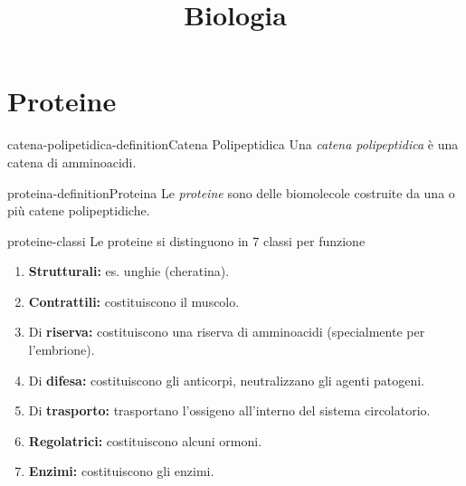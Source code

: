 \documentclass[preview]{standalone}
\begin{document}
\title{Biologia}
\genpage

\section{Proteine}




\begin{snippetdefinition}{catena-polipetidica-definition}{Catena Polipeptidica}
    Una \textit{catena polipeptidica} è una catena di amminoacidi.
\end{snippetdefinition}

\begin{snippetdefinition}{proteina-definition}{Proteina}
    Le \textit{proteine} sono delle biomolecole costruite
    da una o più catene polipeptidiche.
\end{snippetdefinition}

\begin{snippet}{proteine-classi}
    Le proteine si distinguono in 7 classi per funzione
    \begin{enumerate}
        \item \textbf{Strutturali:} es. unghie (cheratina).

        \item \textbf{Contrattili:} costituiscono il muscolo.

        \item Di \textbf{riserva:} costituiscono una riserva di amminoacidi (specialmente per l'embrione).

        \item Di \textbf{difesa:} costituiscono gli anticorpi, neutralizzano gli agenti patogeni.
        
        \item Di \textbf{trasporto:} trasportano l'ossigeno all'interno del sistema circolatorio.

        \item \textbf{Regolatrici:} costituiscono alcuni ormoni.

        \item \textbf{Enzimi:} costituiscono gli enzimi.
    \end{enumerate}
\end{snippet}
\end{document}
